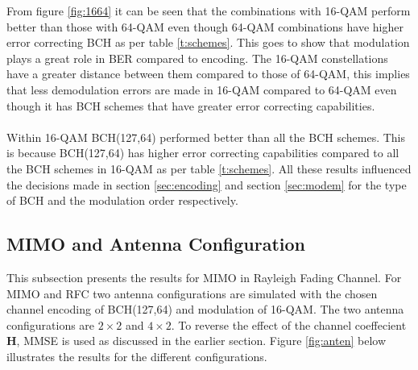 \documentclass[11pt]{report}
\renewcommand{\vec}[1]{\mathbf{#1}} %
\begin{document}
\vspace{12pt}
From figure \ref{fig:1664} it can be seen that the combinations with 16-QAM perform better than those with 64-QAM even though 64-QAM combinations have higher error correcting BCH as per table \ref{t:schemes}. This goes to show that modulation plays a great role in BER compared to encoding. The 16-QAM constellations have a greater distance between them compared to those of 64-QAM, this implies that less demodulation errors are made in 16-QAM compared to 64-QAM even though it has BCH schemes that have greater error correcting capabilities.
\\
\\
Within 16-QAM BCH(127,64) performed better than all the BCH schemes. This is because BCH(127,64) has higher error correcting capabilities compared to all the BCH schemes in 16-QAM as per table \ref{t:schemes}. All these results influenced the decisions made in section \ref{sec:encoding} and section \ref{sec:modem} for the type of BCH and the modulation order respectively.

\subsection{MIMO and Antenna Configuration}
This subsection presents the results for MIMO in Rayleigh Fading Channel. For MIMO and RFC two antenna configurations are simulated with the chosen channel encoding of BCH(127,64) and modulation of 16-QAM. The two antenna configurations are $2\times2$ and $4\times2$. To reverse the effect of the channel coeffecient $\vec{H}$, MMSE is used as discussed in the earlier section. Figure \ref{fig:anten} below illustrates the results for the different configurations.
\end{document}
